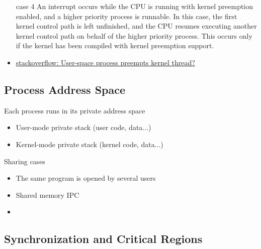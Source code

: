 \begin{description}
\begin{itemize}
    starts processing another kernel control path to handle the interrupt. The first
    kernel control path resumes when the interrupt handler terminates. In this case, the
    two kernel control paths run in the execution context of the same process, and the
    total system CPU time is accounted to it. However, the interrupt handler doesn't
    necessarily operate on behalf of the process.
  \item[case 4] An interrupt occurs while the CPU is running with kernel preemption
    enabled, and a higher priority process is runnable. In this case, the first kernel
    control path is left unfinished, and the CPU resumes executing another kernel control
    path on behalf of the higher priority process. This occurs only if the kernel has been
    compiled with kernel preemption support.
  \item
    \href{http://stackoverflow.com/questions/8453294/userspace-process-preempts-kernel-thread}{stackoverflow:
      User-space process preempts kernel thread?}
  \end{itemize}
\end{description}

\subsection{Process Address Space}
\label{sec:proc-addr-space}

\begin{frame}%
  \begin{exampleblock}{Each process runs in its private address space}
    \begin{itemize}
    \item User-mode private stack (user code, data...)
    \item Kernel-mode private stack (kernel code, data...)
    \end{itemize}
  \end{exampleblock}
  \begin{exampleblock}{Sharing cases}
    \begin{itemize}
    \item The same program is opened by several users
    \item Shared memory IPC
    \item {}
    \end{itemize}
  \end{exampleblock}
\end{frame}

\subsection{Synchronization and Critical Regions}

